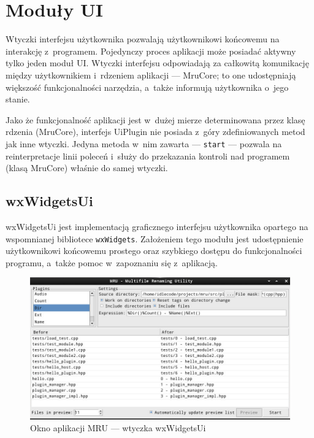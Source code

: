 \section{Moduły UI}
\par
Wtyczki interfejsu użytkownika pozwalają użytkownikowi końcowemu na interakcję z~programem.
Pojedynczy proces aplikacji może posiadać aktywny tylko jeden moduł UI. 
Wtyczki interfejsu odpowiadają za całkowitą komunikację między użytkownikiem i~rdzeniem aplikacji --- MruCore; to one udostępniają większość funkcjonalności narzędzia, a~także informują użytkownika o~jego stanie.
\par
Jako że funkcjonalność aplikacji jest w~dużej mierze determinowana przez klasę rdzenia (MruCore), interfejs UiPlugin nie posiada z~góry zdefiniowanych metod jak inne wtyczki. Jedyna metoda w~nim zawarta --- \texttt{start} --- pozwala na reinterpretacje linii poleceń i~służy do przekazania kontroli nad programem (klasą MruCore) właśnie do samej wtyczki.

\subsection{wxWidgetsUi}
\par
wxWidgetsUi jest implementacją graficznego interfejsu użytkownika opartego na wspomnianej bibliotece \texttt{wxWidgets}. Założeniem tego modułu jest udostępnienie użytkownikowi końcowemu prostego oraz szybkiego dostępu do funkcjonalności programu, a~także pomoc w~zapoznaniu się z~aplikacją.

\begin{figure}
\begin{center}
\includegraphics[scale=0.50]{img/wxwidgetsui.png}
\end{center}
\caption{Okno aplikacji MRU --- wtyczka wxWidgetsUi}
\end{figure}

